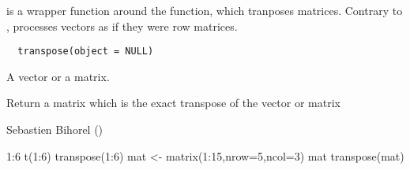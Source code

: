%
\begin{Description}\relax
{} is a wrapper function around the  function, which
tranposes matrices. Contrary to ,  processes vectors
as if they were row matrices.
\end{Description}
%
\begin{Usage}
\begin{verbatim}
  transpose(object = NULL)
\end{verbatim}
\end{Usage}
%
\begin{Arguments}
\begin{ldescription}
\item[\code{object}] A vector or a matrix.
\end{ldescription}
\end{Arguments}
%
\begin{Value}
Return a matrix which is the exact transpose of the vector or matrix 
\end{Value}
%
\begin{Author}\relax
Sebastien Bihorel ()
\end{Author}
%
\begin{SeeAlso}\relax
{}
\end{SeeAlso}
%
\begin{Examples}
\begin{ExampleCode}
  1:6
  t(1:6)
  transpose(1:6)
  mat <- matrix(1:15,nrow=5,ncol=3)
  mat
  transpose(mat)
\end{ExampleCode}
\end{Examples}

